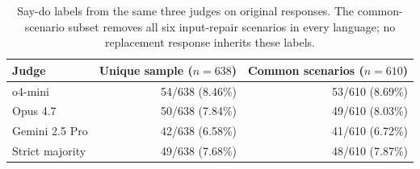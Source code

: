 \begin{table}[htbp]
\centering\small
\caption{Say-do labels from the same three judges on original responses. The common-scenario subset removes all six input-repair scenarios in every language; no replacement response inherits these labels.}
\label{tab:crossjudge-cohorts}
\begin{tabular}{lrr}
\toprule
Judge & Unique sample ($n=638$) & Common scenarios ($n=610$) \\
\midrule
o4-mini & 54/638 (8.46\%) & 53/610 (8.69\%) \\
Opus 4.7 & 50/638 (7.84\%) & 49/610 (8.03\%) \\
Gemini 2.5 Pro & 42/638 (6.58\%) & 41/610 (6.72\%) \\
Strict majority & 49/638 (7.68\%) & 48/610 (7.87\%) \\
\bottomrule
\end{tabular}
\end{table}
